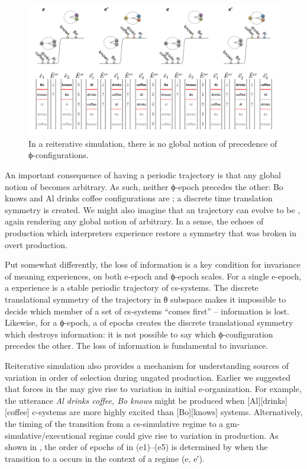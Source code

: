  
\begin{figure}
\includegraphics[width=\textwidth]{figures/Tilsen-img115.png}
\caption{In a reiterative simulation, there is no global notion of precedence of ϕ-con\-fig\-u\-ra\-tions.}
\label{fig:5:11}
\end{figure}
 

  An important consequence of having a periodic trajectory is that any global notion of  becomes arbitrary. As such, neither ϕ-epoch precedes the other: {\textbar}Bo knows{\textbar} and {\textbar}Al drinks coffee{\textbar} configurations are ; a discrete time translation symmetry is created. We might also imagine that an  trajectory can evolve to be , again rendering any global notion of  arbitrary. In a sense, the echoes of production which interpreters experience restore a symmetry that was broken in overt production. 

  Put somewhat differently, the loss of  information is a key condition for invariance of meaning experiences, on both e-epoch and ϕ-epoch scales. For a single e-epoch, a  experience is a stable periodic trajectory of cs-sys\-tems. The discrete translational symmetry of the trajectory in θ subspace makes it impossible to decide which member of a set of cs-sys\-tems “comes first” --  information is lost. Likewise, for a ϕ-epoch, a  of epochs creates the discrete translational symmetry which destroys  information: it is not possible to say which ϕ-con\-fig\-u\-ra\-tion precedes the other. The loss of  information is fundamental to invariance. 

  Reiterative simulation also provides a mechanism for understanding sources of variation in order of selection during ungated production. Earlier we suggested that  forces in the  may give rise to variation in initial e-organization. For example, the utterance \textit{Al drinks coffee, Bo knows} might be produced when [Al][drinks][coffee] c-sys\-tems are more highly excited than [Bo][knows] systems. Alternatively, the timing of the transition from a  cs-simulative regime to a gm-simulative/executional regime could give rise to variation in production. As shown in {}, the order of epochs of  in (e1)--(e5) is determined by when the transition to a  occurs in the context of a  regime (e, e′).

